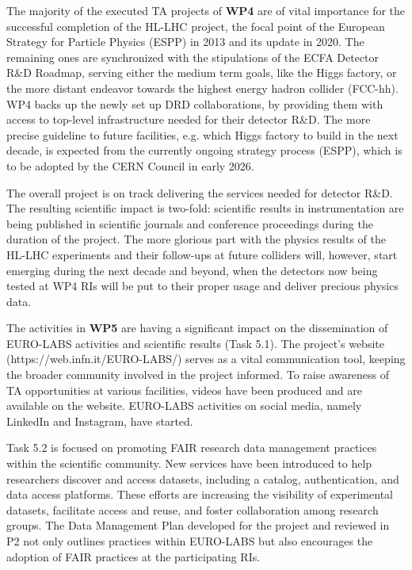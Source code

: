 
The majority of the executed TA projects of \textbf{WP4} are of vital importance for the successful completion of the HL-LHC project, the focal point of the European Strategy for Particle Physics (ESPP) in 2013 and its update in 2020. The remaining ones are synchronized with the stipulations of the ECFA Detector R\&D Roadmap, serving either the medium term goals, like the Higgs factory, or the more distant endeavor towards the highest energy hadron collider (FCC-hh). WP4 backs up the newly set up DRD collaborations, by providing them with access to top-level infrastructure needed for their detector R\&D. The more precise guideline to future facilities, e.g. which Higgs factory to build in the next decade, is expected from the currently ongoing strategy process (ESPP), which is to be adopted by the CERN Council in early 2026.

The overall project is on track delivering the services needed for detector R\&D. The resulting scientific impact is two-fold: scientific results in instrumentation are being published in scientific journals and conference proceedings during the duration of the project. The more glorious part with the physics results of the HL-LHC experiments and their follow-ups at future colliders will, however, start emerging during the next decade and beyond, when the detectors now being tested at WP4 RIs will be put to their proper usage and deliver precious physics data.

The activities in \textbf{WP5} are having a significant impact on the dissemination of EURO-LABS activities and scientific results (Task 5.1). The project’s website (https://web.infn.it/EURO-LABS/) serves as a vital communication tool, keeping the broader community involved in the project informed. To raise awareness of TA opportunities at various facilities, videos have been produced and are available on the website. EURO-LABS activities on social media, namely LinkedIn and Instagram, have started.  

Task 5.2 is focused on promoting FAIR research data management practices within the scientific community. New services have been introduced to help researchers discover and access datasets, including a catalog, authentication, and data access platforms. These efforts are increasing the visibility of experimental datasets, facilitate access and reuse, and foster collaboration among research groups. The Data Management Plan developed for the project and reviewed in P2 not only outlines practices within EURO-LABS but also encourages the adoption of FAIR practices at the participating RIs.

